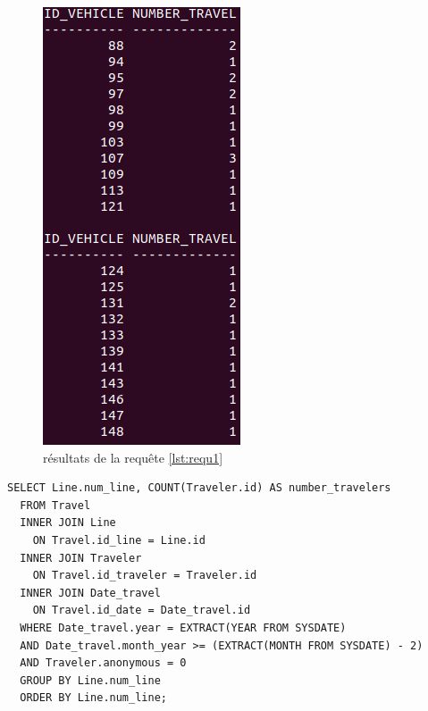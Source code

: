 \documentclass[a4paper,12pt]{report}
\begin{document}
\begin{figure}[!ht]
  \centering
  \includegraphics[scale=0.5]{images/requetes_analytiques/requ1.png}
  \caption{résultats de la requête \ref{lst:requ1}}
\end{figure}

\begin{lstlisting}[caption={le nombre de voyageurs abonnés par ligne pour chaque voyage pour les deux derniers mois}, label={lst:requ2}]
  SELECT Line.num_line, COUNT(Traveler.id) AS number_travelers
  FROM Travel
  INNER JOIN Line
    ON Travel.id_line = Line.id
  INNER JOIN Traveler
    ON Travel.id_traveler = Traveler.id
  INNER JOIN Date_travel
    ON Travel.id_date = Date_travel.id
  WHERE Date_travel.year = EXTRACT(YEAR FROM SYSDATE)
  AND Date_travel.month_year >= (EXTRACT(MONTH FROM SYSDATE) - 2)
  AND Traveler.anonymous = 0
  GROUP BY Line.num_line
  ORDER BY Line.num_line;
\end{lstlisting}
\end{document}
